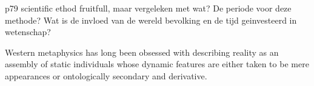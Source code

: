 p79 scientific ethod fruitfull, maar vergeleken met wat? De periode voor deze methode? Wat is de invloed van de wereld bevolking en de tijd geinvesteerd in wetenschap?



















Western metaphysics has long been obsessed with describing reality as an assembly of static individuals whose dynamic features are either taken to be mere appearances or ontologically secondary and derivative. 

